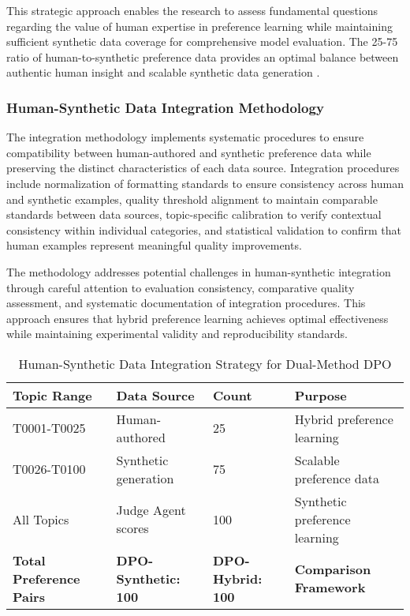 This strategic approach enables the research to assess fundamental questions regarding the value of human expertise in preference learning while maintaining sufficient synthetic data coverage for comprehensive model evaluation. The 25-75 ratio of human-to-synthetic preference data provides an optimal balance between authentic human insight and scalable synthetic data generation \cite{gallego2024configurable_safety}.

\subsubsection{Human-Synthetic Data Integration Methodology}

The integration methodology implements systematic procedures to ensure compatibility between human-authored and synthetic preference data while preserving the distinct characteristics of each data source. Integration procedures include normalization of formatting standards to ensure consistency across human and synthetic examples, quality threshold alignment to maintain comparable standards between data sources, topic-specific calibration to verify contextual consistency within individual categories, and statistical validation to confirm that human examples represent meaningful quality improvements.

The methodology addresses potential challenges in human-synthetic integration through careful attention to evaluation consistency, comparative quality assessment, and systematic documentation of integration procedures. This approach ensures that hybrid preference learning achieves optimal effectiveness while maintaining experimental validity and reproducibility standards.

\begin{table}[htbp]
    \centering
    \caption{Human-Synthetic Data Integration Strategy for Dual-Method DPO}
    \label{tab:human-synthetic-integration}
    \begin{tabular}{|l|l|l|l|}
    \hline
    \textbf{Topic Range} & \textbf{Data Source} & \textbf{Count} & \textbf{Purpose} \\
    \hline
    T0001-T0025 & Human-authored & 25 & Hybrid preference learning \\
    T0026-T0100 & Synthetic generation & 75 & Scalable preference data \\
    All Topics & Judge Agent scores & 100 & Synthetic preference learning \\
    \hline
    \textbf{Total Preference Pairs} & \textbf{DPO-Synthetic: 100} & \textbf{DPO-Hybrid: 100} & \textbf{Comparison Framework} \\
    \hline
    \end{tabular}
\end{table}

